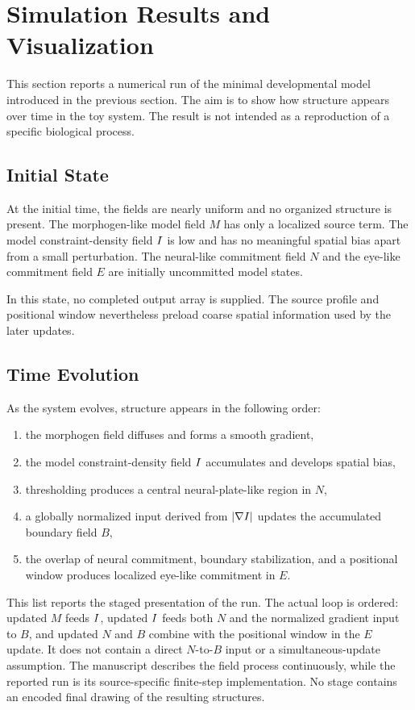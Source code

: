 \section{Simulation Results and Visualization}

This section reports a numerical run of the minimal developmental model introduced in the previous section. The aim is to show how structure appears over time in the toy system. The result is not intended as a reproduction of a specific biological process.

\subsection{Initial State}

At the initial time, the fields are nearly uniform and no organized structure is present. The morphogen-like model field \(M\) has only a localized source term. The model constraint-density field \(I\) is low and has no meaningful spatial bias apart from a small perturbation. The neural-like commitment field \(N\) and the eye-like commitment field \(E\) are initially uncommitted model states.

In this state, no completed output array is supplied. The source profile and positional window nevertheless preload coarse spatial information used by the later updates.

\subsection{Time Evolution}

As the system evolves, structure appears in the following order:
\begin{enumerate}
  \item the morphogen field diffuses and forms a smooth gradient,
  \item the model constraint-density field \(I\) accumulates and develops spatial bias,
  \item thresholding produces a central neural-plate-like region in \(N\),
  \item a globally normalized input derived from \(|\nabla I|\) updates the accumulated boundary field \(B\),
  \item the overlap of neural commitment, boundary stabilization, and a positional window produces localized eye-like commitment in \(E\).
\end{enumerate}
This list reports the staged presentation of the run. The actual loop is ordered: updated \(M\) feeds \(I\), updated \(I\) feeds both \(N\) and the normalized gradient input to \(B\), and updated \(N\) and \(B\) combine with the positional window in the \(E\) update. It does not contain a direct \(N\)-to-\(B\) input or a simultaneous-update assumption.
The manuscript describes the field process continuously, while the reported run is its source-specific finite-step implementation. No stage contains an encoded final drawing of the resulting structures.

